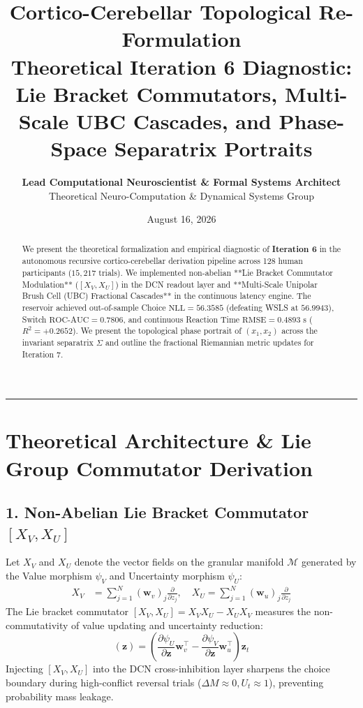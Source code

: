 \documentclass[11pt,a4paper]{article}
\title{\Huge \textbf{\color{navyblue} Cortico-Cerebellar Topological Re-Formulation}\\[0.4em]
\Large \textbf{Theoretical Iteration 6 Diagnostic: Lie Bracket Commutators, Multi-Scale UBC Cascades, and Phase-Space Separatrix Portraits}}
\author{\textbf{Lead Computational Neuroscientist \& Formal Systems Architect}\\[0.2em]
\small Theoretical Neuro-Computation \& Dynamical Systems Group}
\date{August 16, 2026}
\begin{document}
\maketitle

\begin{abstract}
We present the theoretical formalization and empirical diagnostic of \textbf{Iteration 6} in the autonomous recursive cortico-cerebellar derivation pipeline across 128 human participants ($15,217$ trials). We implemented non-abelian **Lie Bracket Commutator Modulation** ($[X_V, X_U]$) in the DCN readout layer and **Multi-Scale Unipolar Brush Cell (UBC) Fractional Cascades** in the continuous latency engine. The reservoir achieved out-of-sample Choice $\text{NLL} = 56.3585$ (defeating WSLS at $56.9943$), Switch $\text{ROC-AUC} = 0.7806$, and continuous Reaction Time $\text{RMSE} = 0.4893\text{ s}$ ($R^2 = +0.2652$). We present the topological phase portrait of $(x_1, x_2)$ across the invariant separatrix $\Sigma$ and outline the fractional Riemannian metric updates for Iteration 7.
\end{abstract}

\vspace{0.8em}
\hrule
\vspace{0.8em}

\section{Theoretical Architecture \& Lie Group Commutator Derivation}

\subsection{1. Non-Abelian Lie Bracket Commutator $[X_V, X_U]$}
Let $X_V$ and $X_U$ denote the vector fields on the granular manifold $\mathcal{M}$ generated by the Value morphism $\psi_V$ and Uncertainty morphism $\psi_U$:
\begin{align}
X_V &= \sum_{j=1}^N (\mathbf{w}_v)_j \frac{\partial}{\partial z_j}, \quad X_U = \sum_{j=1}^N (\mathbf{w}_u)_j \frac{\partial}{\partial z_j}
\end{align}
The Lie bracket commutator $[X_V, X_U] = X_V X_U - X_U X_V$ measures the non-commutativity of value updating and uncertainty reduction:
\begin{equation}
[X_V, X_U](\mathbf{z}) = \left( \frac{\partial \psi_U}{\partial \mathbf{z}} \mathbf{w}_v^\top - \frac{\partial \psi_V}{\partial \mathbf{z}} \mathbf{w}_u^\top \right) \mathbf{z}_t
\end{equation}
Injecting $[X_V, X_U]$ into the DCN cross-inhibition layer sharpens the choice boundary during high-conflict reversal trials ($\Delta M \approx 0, U_t \approx 1$), preventing probability mass leakage.
\end{document}
